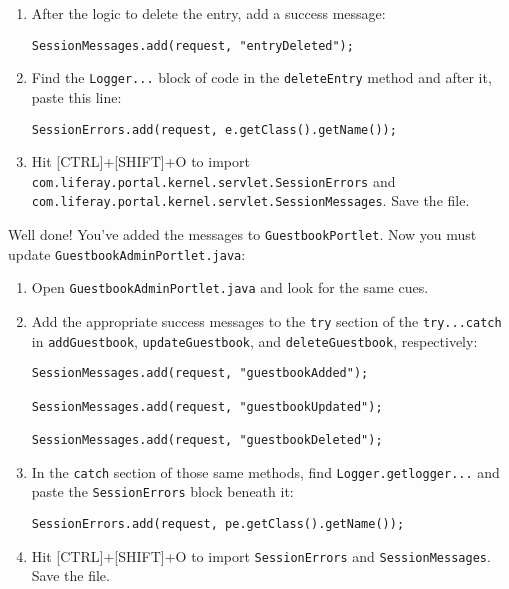 \begin{enumerate}
\def\labelenumi{\arabic{enumi}.}
\item
  After the logic to delete the entry, add a success message:

\begin{verbatim}
SessionMessages.add(request, "entryDeleted");
\end{verbatim}
\item
  Find the \texttt{Logger...} block of code in the \texttt{deleteEntry}
  method and after it, paste this line:

\begin{verbatim}
SessionErrors.add(request, e.getClass().getName());
\end{verbatim}
\item
  Hit {[}CTRL{]}+{[}SHIFT{]}+O to import
  \texttt{com.liferay.portal.kernel.servlet.SessionErrors} and
  \texttt{com.liferay.portal.kernel.servlet.SessionMessages}. Save the
  file.
\end{enumerate}

Well done! You've added the messages to \texttt{GuestbookPortlet}. Now
you must update \texttt{GuestbookAdminPortlet.java}:

\begin{enumerate}
\def\labelenumi{\arabic{enumi}.}
\item
  Open \texttt{GuestbookAdminPortlet.java} and look for the same cues.
\item
  Add the appropriate success messages to the \texttt{try} section of
  the \texttt{try...catch} in \texttt{addGuestbook},
  \texttt{updateGuestbook}, and \texttt{deleteGuestbook}, respectively:

\begin{verbatim}
SessionMessages.add(request, "guestbookAdded");

SessionMessages.add(request, "guestbookUpdated");

SessionMessages.add(request, "guestbookDeleted");
\end{verbatim}
\item
  In the \texttt{catch} section of those same methods, find
  \texttt{Logger.getlogger...} and paste the \texttt{SessionErrors}
  block beneath it:

\begin{verbatim}
SessionErrors.add(request, pe.getClass().getName());
\end{verbatim}
\item
  Hit {[}CTRL{]}+{[}SHIFT{]}+O to import \texttt{SessionErrors} and
  \texttt{SessionMessages}. Save the file.
\end{enumerate}

